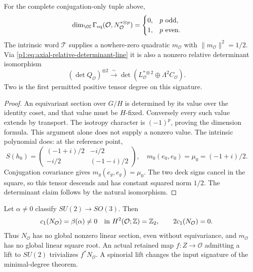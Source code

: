 \documentclass[11pt]{article}
\begin{document}
\begin{theorem}
\label{p1:thm:joint-orbit-quadratic-descent}
For the complete conjugation-only tuple above,
\[
 \dim_\CC\Gamma_{\rm eq}(\mathcal O,N_{\mathcal O}^{*\otimes p})
 =\begin{cases}0,&p\text{ odd},\\1,&p\text{ even}.
 \end{cases}
\]
The intrinsic word \(\mathcal T\) supplies a nowhere-zero quadratic
\(m_{\mathcal O}\) with \(\|m_{\mathcal O}\|^2=1/2\).  Via
\eqref{p1:eq:axial-relative-determinant-line} it is also a nonzero relative
determinant isomorphism
\[
 (\det Q_{\mathcal O})^{\otimes2}
 \xrightarrow{\ \sim\ }
 \det(L_{\mathcal O}^{*\otimes2}\oplus\Lambda^2C_{\mathcal O}).
\]
Two is the first permitted positive tensor degree on this signature.
\end{theorem}

\begin{proof}
An equivariant section over \(G/H\) is determined by its value over the
identity coset, and that value must be \(H\)-fixed.  Conversely every such
value extends by transport.  The isotropy character is \((-1)^p\),
proving the dimension formula.  This argument alone does not supply a
nonzero value.  The intrinsic polynomial does: at the reference point,
\[
 S(h_0)=\begin{pmatrix}(-1+i)/2&-i/2\\-i/2&(-1-i)/2\end{pmatrix},
 \quad m_0(e_0,e_0)=\mu_0=(-1+i)/2.
\]
Conjugation covariance gives \(m_g(e_g,e_g)=\mu_0\).  The two deck signs
cancel in the square, so this tensor descends and has constant squared norm
\(1/2\).  The determinant claim follows by the natural isomorphism.
\end{proof}

\begin{corollary}
\label{p1:cor:joint-orbit-sign-line-torsion}
Let \(\alpha\ne0\) classify \(SU(2)\to SO(3)\).  Then
\[
 c_1(N_{\mathcal O})=\beta(\alpha)\ne0
 \quad\hbox{in }H^2(\mathcal O;\mathbb Z)=\mathbb Z_2,
 \qquad 2c_1(N_{\mathcal O})=0.
\]
Thus \(N_{\mathcal O}\) has no global nonzero linear section, even without
equivariance, and \(m_{\mathcal O}\) has no global linear square root.
An actual retained map \(f:Z\to\mathcal O\) admitting a lift to \(SU(2)\)
trivializes \(f^*N_{\mathcal O}\).  A spinorial lift changes the input
signature of the minimal-degree theorem.
\end{corollary}
\end{document}
